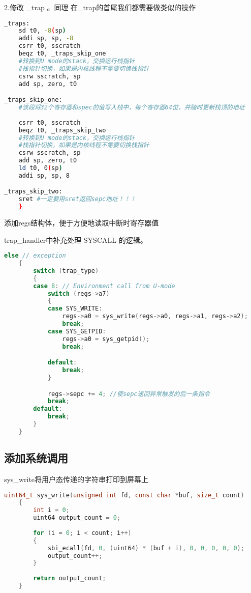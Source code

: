 \documentclass{source/Report}
\begin{document}
2.修改 \_trap 。同理 在\_trap的首尾我们都需要做类似的操作

\begin{lstlisting}[language = bash, title = { \_trap}]
    _traps:
    sd t0, -8(sp)
    addi sp, sp, -8
    csrr t0, sscratch
    beqz t0, _traps_skip_one
    #转换到U mode的stack，交换运行栈指针
    #栈指针切换，如果是内核线程不需要切换栈指针
    csrw sscratch, sp
    add sp, zero, t0

_traps_skip_one:
    #该段将32个寄存器和spec的值写入栈中，每个寄存器64位，并随时更新栈顶的地址
    
    csrr t0, sscratch
    beqz t0, _traps_skip_two
    #转换到U mode的stack，交换运行栈指针
    #栈指针切换，如果是内核线程不需要切换栈指针
    csrw sscratch, sp
    add sp, zero, t0
    ld t0, 0(sp)
    addi sp, sp, 8

_traps_skip_two:
    sret #一定要用sret返回sepc地址！！！
    }
\end{lstlisting}

添加regs结构体，便于方便地读取中断时寄存器值

trap\_handler中补充处理 SYSCALL 的逻辑。 

\begin{lstlisting}[language = c, title = {trap\_handler}]
    else // exception
    {
        switch (trap_type)
        {
        case 8: // Environment call from U-mode
            switch (regs->a7)
            {
            case SYS_WRITE:
                regs->a0 = sys_write(regs->a0, regs->a1, regs->a2);
                break;
            case SYS_GETPID:
                regs->a0 = sys_getpid();
                break;

            default:
                break;
            }

            regs->sepc += 4; //使sepc返回异常触发的后一条指令
            break;
        default:
            break;
        }
    }
\end{lstlisting}

\subsection{添加系统调用}

sys\_write将用户态传递的字符串打印到屏幕上

\begin{lstlisting}[language = c, title = {sys\_write}]
    uint64_t sys_write(unsigned int fd, const char *buf, size_t count)
    {
        int i = 0;
        uint64 output_count = 0;
    
        for (i = 0; i < count; i++)
        {
            sbi_ecall(fd, 0, (uint64) * (buf + i), 0, 0, 0, 0, 0);
            output_count++;
        }
    
        return output_count;
    }
\end{lstlisting}
\end{document}
